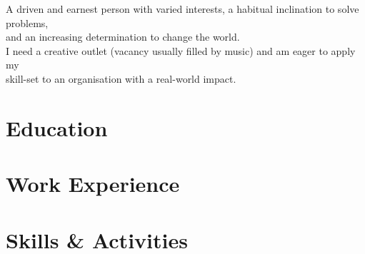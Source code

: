 \documentclass[a4paper]{lu.citrusfruit.latex.cv}
\begin{document}



\begin{selfdescription}
A driven and earnest person with varied interests, a habitual inclination to solve problems,\\and an increasing determination to change the world.\\
I need a creative outlet (vacancy usually filled by music) and am eager to apply my\\skill-set to an organisation with a real-world impact.
\end{selfdescription}

\section{Education}

\section{Work Experience}

\section{Skills \& Activities}
\end{document}
